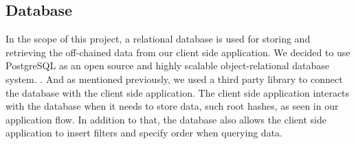 \subsection{Database}
\label{subsec:approach-database}

In the scope of this project, a relational database is used for storing and retrieving the off-chained data from our client side application. We decided to use PostgreSQL as an open source and highly scalable object-relational database system. \cite{relatedWork35}. And as mentioned previously, we used a third party library to connect the database with the client side application. The client side application interacts with the database when it needs to store data, such root hashes, as seen in our application flow. In addition to that, the database also allows the client side application to insert filters and specify order when querying data.
